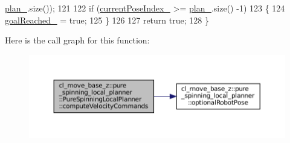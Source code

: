 \begin{DoxyCode}
      \hyperlink{classcl__move__base__z_1_1pure__spinning__local__planner_1_1PureSpinningLocalPlanner_a31875ee78bae4698b579e20c0754860d}{plan\_}.size());
121 
122   \textcolor{keywordflow}{if} (\hyperlink{classcl__move__base__z_1_1pure__spinning__local__planner_1_1PureSpinningLocalPlanner_aa0f9b4cf52a76e44dc2cfc5103d52dcd}{currentPoseIndex\_} >= \hyperlink{classcl__move__base__z_1_1pure__spinning__local__planner_1_1PureSpinningLocalPlanner_a31875ee78bae4698b579e20c0754860d}{plan\_}.size() -1)
123   \{
124     \hyperlink{classcl__move__base__z_1_1pure__spinning__local__planner_1_1PureSpinningLocalPlanner_aecfe0dfc68b8c8e461e8b684e5fa4d2f}{goalReached\_} = \textcolor{keyword}{true};
125   \}
126 
127   \textcolor{keywordflow}{return} \textcolor{keyword}{true};
128 \}
\end{DoxyCode}
Here is the call graph for this function\+:
\nopagebreak
\begin{figure}[H]
\begin{center}
\leavevmode
\includegraphics[width=350pt]{classcl__move__base__z_1_1pure__spinning__local__planner_1_1PureSpinningLocalPlanner_af7dfee89a0a6c54569b5fd262ccbd4f0_cgraph}
\end{center}
\end{figure}
\mbox{\label{classcl__move__base__z_1_1pure__spinning__local__planner_1_1PureSpinningLocalPlanner_afc2d05b55e4a68932bbf8b4aabe9e219}} 
